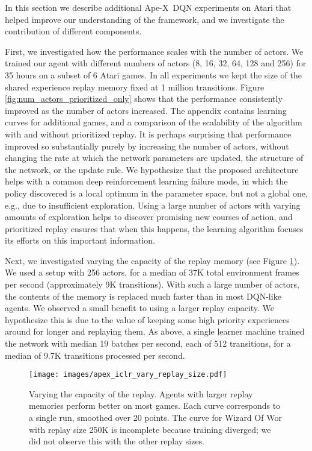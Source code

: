 \documentclass{article} \PassOptionsToPackage{usenames,dvipsnames}{xcolor}
\def\apex{Ape-X}
\def\smallcaption#1{\caption{\small #1}\vspace{-0.4cm}}
\begin{document}
In this section we describe additional \apex\ DQN experiments on Atari that helped improve our understanding of the framework, and we investigate the contribution of different components.

First, we investigated how the performance scales with the number of actors. We trained our agent with different numbers of actors (8, 16, 32, 64, 128 and 256) for 35 hours on a subset of 6 Atari games. In all experiments we kept the size of the shared experience replay memory fixed at 1 million transitions. Figure \ref{fig:num_actors_prioritized_only} shows that the performance consistently improved as the number of actors increased. The appendix contains learning curves for additional games, and a comparison of the scalability of the algorithm with and without prioritized replay. It is perhaps surprising that performance improved so substantially purely by increasing the number of actors, without changing the rate at which the network parameters are updated, the structure of the network, or the update rule. We hypothesize that the proposed architecture helps with a common deep reinforcement learning failure mode, in which the policy discovered is a local optimum in the parameter space, but not a global one, e.g., due to insufficient exploration. Using a large number of actors with varying amounts of exploration helps to discover promising new courses of action, and prioritized replay ensures that when this happens, the learning algorithm focuses its efforts on this important information. 


Next, we investigated varying the capacity of the replay memory (see Figure \ref{fig:vary_replay_size}). We used a setup with 256 actors, for a median of 37K total environment frames per second (approximately 9K transitions). With such a large number of actors, the contents of the memory is replaced much faster than in most DQN-like agents. We observed a small benefit to using a larger replay capacity. We hypothesize this is due to the value of keeping some high priority experiences around for longer and replaying them. As above, a single learner machine trained the network with median 19 batches per second, each of 512 transitions, for a median of 9.7K transitions processed per second.

\begin{figure}
    \centering
    \texttt{[image: images/apex\_iclr\_vary\_replay\_size.pdf]}
    \smallcaption{Varying the capacity of the replay. Agents with larger replay memories perform better on most games. Each curve corresponds to a single run, smoothed over 20 points. The curve for Wizard Of Wor with replay size 250K is incomplete because training diverged; we did not observe this with the other replay sizes.}
    \label{fig:vary_replay_size}
\end{figure}
\end{document}
